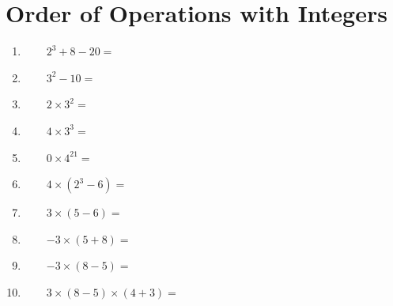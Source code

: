 \documentclass[a4paper,12pt]{article}
\begin{document}
\section{Order of Operations with Integers}
\vspace{0.75cm}
\begin{tcolorbox}[colback=red!0!white, colframe=gray ,title=\subsubsection{Evaluate the following.}\label{op1}]
	\begin{multicols}{2}
		\begin{enumerate}[label=\footnotesize \roman*)]
			\item ~~~~$2^3+8-20=$
			\item ~~~~$3^{2}-10=$
			\item ~~~~$2\times3^2=$
			\item ~~~~$4\times3^3=$
			\item ~~~~$0\times4^{21}=$
			\item ~~~~$4\times(2^3-6)=$
			\item ~~~~$3\times(5-6)=$
			\item ~~~~$-3\times(5+8)=$
			\item ~~~~$-3\times(8-5)=$
			\item ~~~~$3\times(8-5)\times(4+3)=$
		\end{enumerate}
	\end{multicols}
\end{tcolorbox}\vspace{0.75cm}
\end{document}
